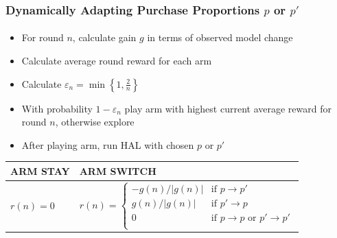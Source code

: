 \documentclass{beamer}
\begin{document}
\begin{frame}[noframenumbering]
    \frametitle{Dynamically Adapting Purchase Proportions $p$ or $p'$}  %
    \framesubtitle{}
\begin{itemize}
      \item For round $n$, calculate gain $g$ in terms of observed model change
      \item Calculate average round reward for each arm
      \item Calculate $\varepsilon_n= \min \left \{1,\frac{2}{n}  \right \}$
      \item With probability $1-\varepsilon_n$ play arm with highest current average reward for round $n$, otherwise explore
      \item After playing arm, run HAL with chosen $p$ or $p'$
    \end{itemize}
    \begin{table}[H]
      \centering
        \label{tab:ClassesAll}
      \begin{tabular}{|l||l|}\hline
        ARM STAY & ARM SWITCH  \\ \hline
        $r(n) = 0$ &
        $r(n)=
            \begin{cases}
               -g(n)/|g(n)| & \text{if } p \rightarrow p'\\
                g(n)/|g(n)| & \text{if } p' \rightarrow p\\
                0 & \text{if }  p \rightarrow  p \text{ or }  p' \rightarrow p' \\
            \end{cases}$ \\ \hline
      \end{tabular}%
    \end{table}
\end{frame}
\end{document}
